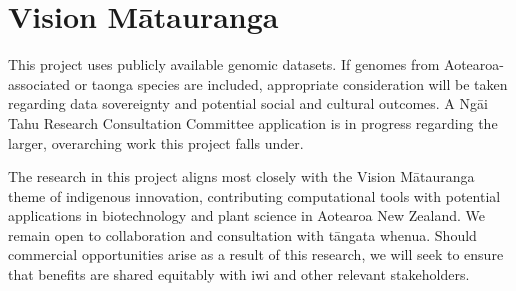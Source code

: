 \section{Vision Mātauranga}

This project uses publicly available genomic datasets. 
If genomes from Aotearoa-associated or taonga species are included, appropriate consideration will be taken regarding data sovereignty and potential social and cultural outcomes. 
A Ngāi Tahu Research Consultation Committee application is in progress regarding the larger, overarching work this project falls under.

The research in this project aligns most closely with the Vision Mātauranga theme of indigenous innovation, contributing computational tools with potential applications in biotechnology and plant science in Aotearoa New Zealand. 
We remain open to collaboration and consultation with tāngata whenua.
Should commercial opportunities arise as a result of this research, we will seek to ensure that benefits are shared equitably with iwi and other relevant stakeholders.